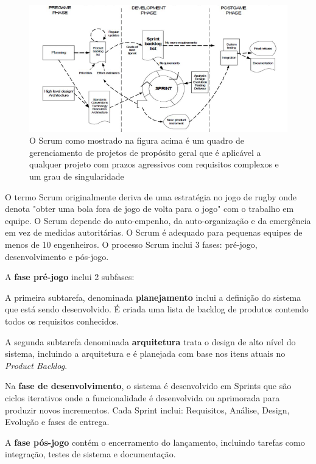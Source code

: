 \documentclass[12pt]{article}
\begin{document}
\begin{figure}[htp]
\centering
\includegraphics[scale=.8] {ScrumModel.png}
\caption{O Scrum como mostrado na figura acima é um quadro de gerenciamento de projetos de propósito geral que é aplicável a qualquer projeto com prazos agressivos com requisitos complexos e um grau de singularidade \cite{rees2002feasible}}
\label{fig:exampleFig5}
\end{figure}

O termo Scrum originalmente deriva de uma estratégia no jogo de rugby onde denota "obter uma bola fora de jogo de volta para o jogo" com o trabalho em equipe. O Scrum depende do auto-empenho, da auto-organização e da emergência em vez de medidas autoritárias. O Scrum é adequado para pequenas equipes de menos de 10 engenheiros. O processo Scrum inclui 3 fases: pré-jogo, desenvolvimento e pós-jogo.

A \textbf{fase pré-jogo} inclui 2 subfases:
    
A primeira subtarefa, denominada \textbf{planejamento} inclui a definição do sistema que está sendo desenvolvido. É criada uma lista de backlog de produtos contendo todos os requisitos conhecidos.

A segunda subtarefa denominada \textbf{arquitetura} trata o design de alto nível do sistema, incluindo a arquitetura e é planejada com base nos itens atuais no \textit{Product Backlog}.
    
Na \textbf{fase de desenvolvimento}, o sistema é desenvolvido em Sprints que são ciclos iterativos onde a funcionalidade é desenvolvida ou aprimorada para produzir novos incrementos. Cada Sprint inclui: Requisitos, Análise, Design, Evolução e fases de entrega.

A \textbf{fase pós-jogo} contém o encerramento do lançamento, incluindo tarefas como integração, testes de sistema e documentação. \cite{Kumar2014}
\end{document}
